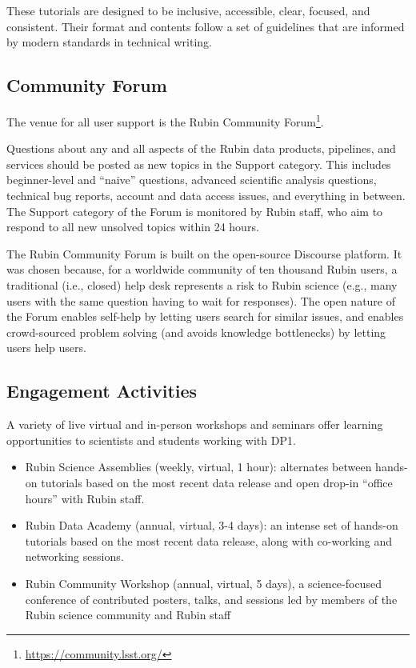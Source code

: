 These tutorials are designed to be inclusive, accessible, clear, focused, and consistent.
Their format and contents follow a set of guidelines \citep{RTN-045} that are informed by modern standards in technical writing.


\subsection{Community Forum}
\label{ssec:forum}

The venue for all user support is the Rubin Community Forum\footnote{\url{https://community.lsst.org/}}.

Questions about any and all aspects of the Rubin data products, pipelines, and services should be posted as new topics in the Support category.
This includes beginner-level and ``naive'' questions, advanced scientific analysis questions, technical bug reports, account and data access issues, and everything in between.
The Support category of the Forum is monitored by Rubin staff, who aim to respond to all new unsolved topics within 24 hours.

The Rubin Community Forum is built on the open-source Discourse platform.
It was chosen because, for a worldwide community of ten thousand Rubin users, a traditional (i.e., closed) help desk represents a risk to Rubin science (e.g., many users with the same question having to wait for responses).
The open nature of the Forum enables self-help by letting users search for similar issues, and enables crowd-sourced problem solving (and avoids knowledge bottlenecks) by letting users help users.


\subsection{Engagement Activities}
\label{ssec:engagement}

A variety of live virtual and in-person workshops and seminars offer learning opportunities to scientists and students working with \gls{DP1}.

\begin{itemize}
\item Rubin Science Assemblies (weekly, virtual, 1 hour): alternates between hands-on tutorials based on the most recent data release and open drop-in ``office hours'' with Rubin staff.
\item Rubin Data Academy (annual, virtual, 3-4 days): an intense set of hands-on tutorials based on the most recent data release, along with co-working and networking sessions.
\item Rubin Community Workshop (annual, virtual, 5 days), a science-focused conference of contributed posters, talks, and sessions led by members of the Rubin science community and Rubin staff
\end{itemize}

